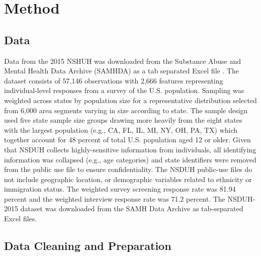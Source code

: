 \documentclass[sigconf]{acmart}
\begin{document}
\section{Method}

\subsection{Data} 

Data from the 2015 NSHUH was downloaded from the Substance Abuse and Mental 
Health Data Archive (SAMHDA) as a tab separated Excel file \cite{samhsa16}. 
The dataset consists of 57,146 observations with 2,666 features representing 
individual-level responses from a survey of the U.S. population. Sampling was 
weighted across states by population size for a representative distribution 
selected from 6,000 area segments varying in size according to state. The 
sample design used five state sample size groups drawing more heavily from 
the eight states with the largest population (e.g., CA, FL, IL, MI, NY, OH, 
PA, TX) which together account for 48 percent of total U.S. population aged 
12 or older. Given that NSDUH collects highly-sensitive information from 
individuals, all identifying information was collapsed (e.g., age categories)
and state identifiers were removed from the public use file to ensure 
confidentiality. The NSDUH public-use files do not include geographic location, 
or demographic variables related to ethnicity or immigration status. The 
weighted survey screening response rate was 81.94 percent and the weighted
interview response rate was 71.2 percent. The NSDUH-2015 dataset was 
downloaded from the SAMH Data Archive as tab-separated Excel files.


\subsection{Data Cleaning and Preparation }
\end{document}
